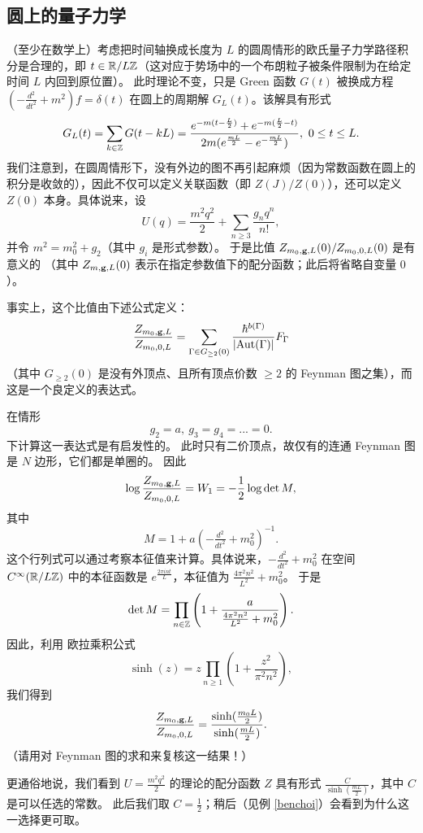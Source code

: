 \subsection{圆上的量子力学} 

（至少在数学上）考虑把时间轴换成长度为 $L$ 的圆周情形的欧氏量子力学路径积分是合理的，即 $t\in \Bbb R/L\Bbb Z$（这对应于势场中的一个布朗粒子被条件限制为在给定时间 $L$ 内回到原位置）。
此时理论不变，只是 Green 函数 $G(t)$ 被换成方程 $(-\frac{d^2}{dt^2}+m^2)f=\delta(t)$ 在圆上的周期解 $G_L(t)$。该解具有形式
\begin{equation}\label{glformula} 
G_L(t)=\sum_{k\in \Bbb
  Z}G(t-kL)=\frac{e^{-m(t-\frac{L}{2})}+e^{-m(\frac{L}{2}-t)}}{2m(e^{\frac{mL}{2}}-e^{-\frac{mL}{2}})},\ 0\le t\le L.
\end{equation} 
我们注意到，在圆周情形下，没有外边的图不再引起麻烦（因为常数函数在圆上的积分是收敛的），因此不仅可以定义关联函数（即 $Z(J)/Z(0)$），还可以定义 $Z(0)$ 本身。具体说来，设
$$
U(q)=\frac{m^2q^2}{2}+\sum_{n\ge 3}\frac{g_nq^n}{n!},
$$ 
并令 $m^2=m_0^2+g_2$（其中 $g_i$ 是形式参数）。
于是比值 $Z_{m_0,\bold
  g,L}(0)/Z_{m_0,0,L}(0)$ 是有意义的
（其中 $Z_{m,\bold g,L}(0)$ 表示在指定参数值下的配分函数；此后将省略自变量 $0$）。

事实上，这个比值由下述公式定义：
$$
\frac{Z_{m_0,\bold g,L}}{Z_{m_0,0,L}}=
\sum_{\Gamma\in G_{\ge 2}(0)}\frac{\hbar^{b(\Gamma)}}{|{\rm Aut}(\Gamma)|}
F_\Gamma
$$
（其中 $G_{\ge 2}(0)$ 是没有外顶点、且所有顶点价数 $\ge 2$ 的 Feynman 图之集），而这是一个良定义的表达式。

在情形
$$
g_2=a,\ g_3=g_4=...=0.
$$ 
下计算这一表达式是有启发性的。
此时只有二价顶点，故仅有的连通 Feynman 图是 $N$ 边形，它们都是单圈的。
因此
$$
\log \frac{Z_{m_0,\bold g,L}}{Z_{m_0,0,L}}=
W_1=-\frac{1}{2}\log \det M,
$$
其中
$$
M=1+a(-\tfrac{d^2}{dt^2}+m_0^2)^{-1}.
$$ 
这个行列式可以通过考察本征值来计算。具体说来，$-\frac{d^2}{dt^2}+m_0^2$ 在空间 $C^\infty(\Bbb R/L\Bbb Z)$ 中的本征函数是 $e^{\frac{2\pi int}{L}}$，本征值为 $\frac{4\pi^2n^2}{L^2}+m_0^2$。
于是
$$
\det M=\prod_{n\in \Bbb
  Z}\left(1+\frac{a}{\frac{4\pi^2n^2}{L^2}+m_0^2}\right).
$$
因此，利用 欧拉乘积公式
$$
\sinh(z)=z\prod_{n\ge 1} \left(1+\frac{z^2}{\pi^2n^2}\right),
$$
我们得到
$$
\frac{Z_{m_0,\bold g,L}}{Z_{m_0,0,L}}=
\frac{\sinh(\frac{m_0L}{2})}{\sinh(\frac{mL}{2})}.
$$
（请用对 Feynman 图的求和来复核这一结果！）

\begin{remark} 更通俗地说，我们看到 $U=\frac{m^2q^2}{2}$ 的理论的配分函数 $Z$ 具有形式
$\frac{C}{\sinh(\frac{mL}{2})}$，其中 $C$ 是可以任选的常数。
此后我们取 $C=\frac{1}{2}$；稍后（见例 \ref{benchoi}）会看到为什么这一选择更可取。
\end{remark}

